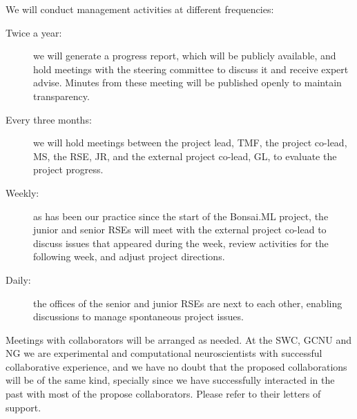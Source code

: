 We will conduct management activities at different frequencies:

\begin{description}

    \item[Twice a year:] we will generate a progress report, which will be
        publicly available, and hold meetings with the steering committee to
        discuss it and receive expert advise. Minutes from these meeting will
        be published openly to maintain transparency.

    \item[Every three months:] we will hold meetings between the project lead, TMF, the
        project co-lead, MS, the RSE, JR, and
        the external project co-lead, GL, to evaluate the project progress.

    \item[Weekly:] as has been our practice since the start of the Bonsai.ML
        project, the junior and senior RSEs will meet with the external project
        co-lead to discuss issues that appeared during the week, review
        activities for the following week, and adjust project directions.

    \item[Daily:] the offices of the senior and junior RSEs are next to each
        other, enabling discussions to manage spontaneous project issues.

\end{description}

Meetings with collaborators will be arranged as needed.
%
At the SWC, GCNU and NG we are experimental and computational neuroscientists
with successful collaborative experience, and we have no doubt that the
proposed collaborations will be of the same kind,
%
specially since we have successfully interacted in the past with most of the
propose collaborators.
%
Please refer to their letters of support.
